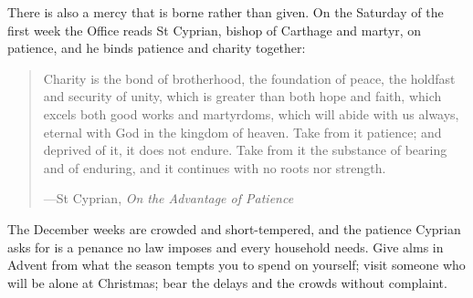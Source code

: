There is also a mercy that is borne rather than given. On
the Saturday of the first week the Office reads St Cyprian, bishop of Carthage
and martyr, on patience, and he binds patience and charity together:

\begin{quote}
Charity is the bond of brotherhood, the foundation of peace, the holdfast and
security of unity, which is greater than both hope and faith, which excels both
good works and martyrdoms, which will abide with us always, eternal with God in
the kingdom of heaven. Take from it patience; and deprived of it, it does not
endure. Take from it the substance of bearing and of enduring, and it continues
with no roots nor strength.\par
{\smallskip\noindent\small ---St Cyprian, \emph{On the Advantage of Patience}\par}
\end{quote}

\noindent The December weeks are crowded and short-tempered, and the patience
Cyprian asks for is a penance no law imposes and every household needs. Give
alms in Advent from what the season tempts you to spend on yourself; visit
someone who will be alone at Christmas; bear the delays and the crowds without
complaint.
